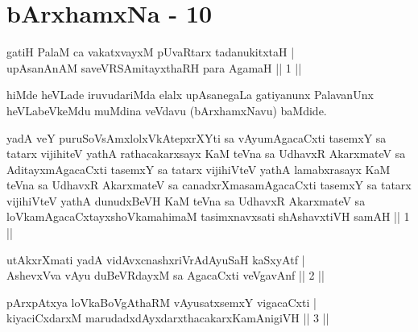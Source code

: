 \chapter{bArxhamxNa - 10}


\begin{shl}
gatiH PalaM ca vakatxvayxM pUvaRtarx tadanukitxtaH | \\
upAsanAnAM saveVRSAmitayxthaRH para AgamaH \hfill ||  1 || 
\end{shl}

\begin{artha}
hiMde heVLade iruvudariMda elalx upAsanegaLa gatiyanunx PalavanUnx heVLabeVkeMdu muMdina veVdavu (bArxhamxNavu) baMdide.
\end{artha}


\begin{kandikeshl}
yadA veY puruSoV\s sAmxlolxVkAtepxrXYti sa vAyumAgacaCxti tasemxY sa tatarx vijihiteV yathA rathacakarxsayx KaM teVna sa UdhavxR AkarxmateV sa AditayxmAgacaCxti tasemxY sa tatarx vijihiVteV yathA lamabxrasayx KaM teVna sa UdhavxR AkarxmateV sa canadxrXmasamAgacaCxti tasemxY sa tatarx vijihiVteV yathA dunudxBeVH KaM teVna sa UdhavxR AkarxmateV sa loVkamAgacaCxtayxshoVkamahimaM tasimxnavxsati shAshavxtiVH samAH || 1 ||
\end{kandikeshl}


\begin{shl}
utAkxrXmati yadA vidAvxcnashxriVrAdAyuSaH kaSxyAtf | \\
AshevxVva vAyu duBeVRdayxM sa AgacaCxti veVgavAnf \hfill ||  2 ||
\end{shl}

\begin{shl}
pArxpAtxya loVkaBoVgAthaRM vAyusatxsemxY vigacaCxti | \\
kiyaciCxdarxM marudadxdAyxdarxthacakarxKamAnigiVH \hfill ||  3 || 
\end{shl}

